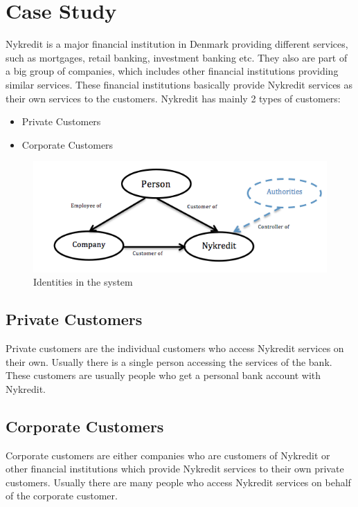 \section{Case Study}
Nykredit is a major financial institution in Denmark providing different services, such as mortgages, retail banking, investment banking etc. They also are part of a big group of companies, which includes other financial institutions providing similar services. These financial institutions basically provide Nykredit services as their own services to the customers.
Nykredit has mainly 2 types of customers:
\begin{itemize}
\item Private Customers
\item Corporate Customers
\end{itemize}
\begin{figure}[h]
	\centering
	\includegraphics[width=\textwidth]{figures/Customers}
	\caption{Identities in the system}
	\label{fig:Customers}
\end{figure}
\subsection{Private Customers}
Private customers are the individual customers who access Nykredit services on their own. Usually there is a single person accessing the services of the bank. These customers are usually people who get a personal bank account with Nykredit.
\subsection{Corporate Customers}
Corporate customers are either companies who are customers of Nykredit or other financial institutions which provide Nykredit services to their own private customers. Usually there are many people who access Nykredit services on behalf of the corporate customer.
